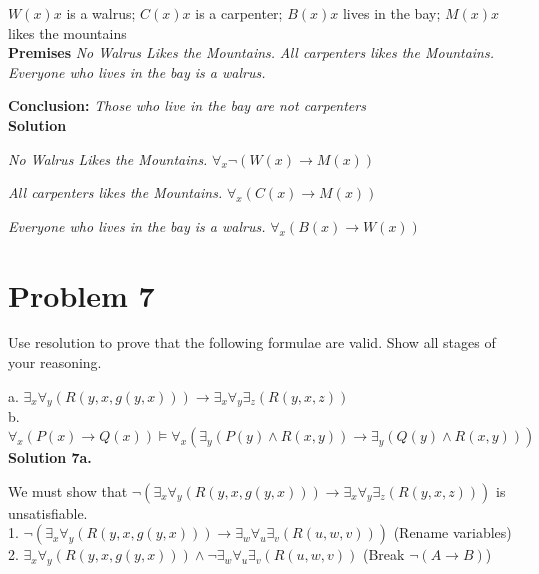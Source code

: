 \documentclass{article}
\newcommand{\solution}{\textbf{\large Solution}}
\newcommand{\tOne}{7.5cm}
\begin{document}
{$W(x) x$ is a walrus; $C(x) x$ is a carpenter; $B(x) x$ lives in the bay; $M(x) x$ likes the mountains\\

\textbf{Premises}
\emph{No Walrus Likes the Mountains.}
\emph{All carpenters likes the Mountains.}
\emph{Everyone who lives in the bay is a walrus.}

\textbf{Conclusion:} \emph{Those who live in the bay are not carpenters}\\

\solution

\emph{No Walrus Likes the Mountains.} \tabto{\tOne}$\forall_x\neg(W(x) \rightarrow M(x))$

\emph{All carpenters likes the Mountains.} \tabto{\tOne}$\forall_x(C(x) \rightarrow M(x))$

\emph{Everyone who lives in the bay is a walrus.} \tabto{\tOne}$\forall_x(B(x) \rightarrow W(x))$




\pagebreak
\section*{Problem 7}

Use resolution to prove that the following formulae are valid. Show all stages of your reasoning.

a. $\exists_x\forall_y(R(y, x, g(y, x))) \rightarrow \exists_x\forall_y\exists_z(R(y, x, z))$\\

b. $\forall_x(P(x) \rightarrow Q(x)) \vDash \forall_x(\exists_y(P(y) \wedge R(x, y)) \rightarrow \exists_y(Q(y) \wedge R(x, y)))$\\

\textbf{\large{Solution 7a.}}

We must show that $\neg(\exists_x\forall_y(R(y, x, g(y, x))) \rightarrow \exists_x\forall_y\exists_z(R(y, x, z)))$ is unsatisfiable.\\

1. $\neg(\exists_x\forall_y(R(y, x, g(y, x))) \rightarrow \exists_w\forall_u\exists_v(R(u, w, v)))$ \tabto{\tOne}(Rename variables)\\

2. $\exists_x\forall_y(R(y, x, g(y, x))) \wedge \neg\exists_w\forall_u\exists_v(R(u, w, v))$ \tabto{\tOne}(Break $\neg(A \rightarrow B)$)\\

}
\end{document}
